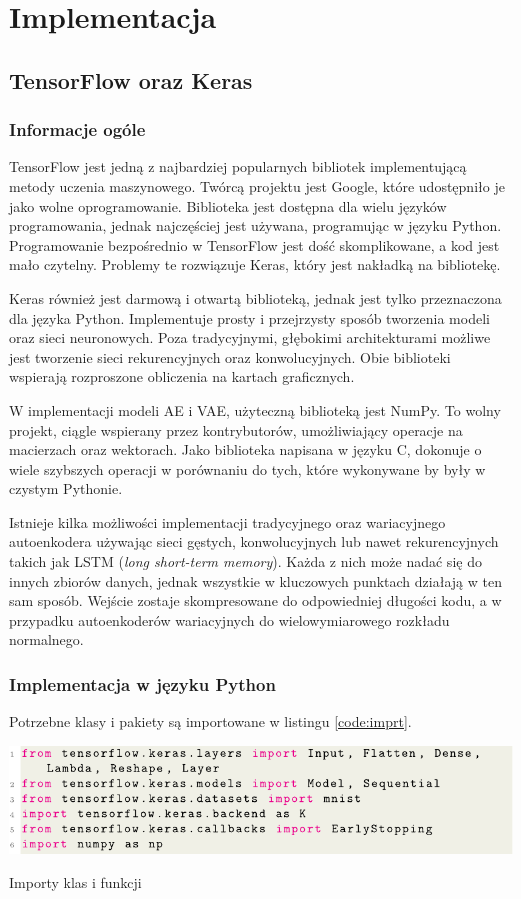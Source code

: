 \documentclass[a4paper,12pt,oneside]{book} %
\begin{document}
\chapter{Implementacja}
\section{TensorFlow oraz Keras}
\subsection{Informacje ogóle}
TensorFlow jest jedną z najbardziej popularnych bibliotek implementującą metody uczenia maszynowego. Twórcą projektu jest Google, które udostępniło je jako wolne oprogramowanie. Biblioteka jest dostępna dla wielu języków programowania, jednak najczęściej jest używana, programując w języku Python. Programowanie bezpośrednio w TensorFlow jest dość skomplikowane, a kod jest mało czytelny. Problemy te rozwiązuje Keras, który jest nakładką na bibliotekę. 

Keras również jest darmową i otwartą biblioteką, jednak jest tylko przeznaczona dla języka Python. Implementuje prosty i przejrzysty sposób tworzenia modeli oraz sieci neuronowych. Poza tradycyjnymi, głębokimi architekturami możliwe jest tworzenie sieci rekurencyjnych oraz konwolucyjnych. Obie biblioteki wspierają rozproszone obliczenia na kartach graficznych. 

W implementacji modeli AE i VAE, użyteczną biblioteką jest NumPy. To wolny projekt, ciągle wspierany przez kontrybutorów, umożliwiający operacje na macierzach oraz wektorach. Jako biblioteka napisana w języku C, dokonuje o wiele szybszych operacji w porównaniu do tych, które wykonywane by były w czystym Pythonie. 

Istnieje kilka możliwości implementacji tradycyjnego oraz wariacyjnego autoenkodera używając sieci gęstych, konwolucyjnych lub nawet rekurencyjnych takich jak LSTM (\textit{long short-term memory}). Każda z nich może nadać się do innych zbiorów danych, jednak wszystkie w kluczowych punktach działają w ten sam sposób. Wejście zostaje skompresowane do odpowiedniej długości kodu, a w przypadku autoenkoderów wariacyjnych do wielowymiarowego rozkładu normalnego. 
\subsection{Implementacja w języku Python}
Potrzebne klasy i pakiety są importowane w listingu \ref{code:imprt}.
\begin{code}[h!]
	\centering
	\includegraphics[width=\linewidth]{importy.pdf}
	\caption{Importy klas i funkcji}
	\label{code:imprt}
\end{code}
\end{document}
